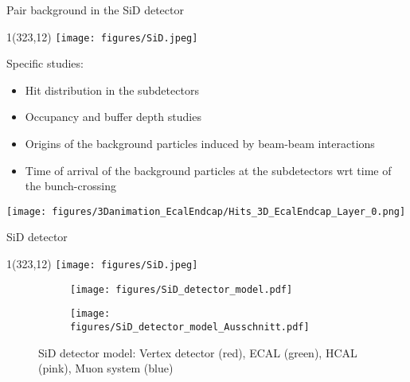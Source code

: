 \documentclass[xcolor={dvipsnames}]{beamer}
\newcommand{\sidlogo}{
  \setlength{\TPHorizModule}{1pt}
  \setlength{\TPVertModule}{1pt}
  \begin{textblock}{1}(323,12)
   \texttt{[image: figures/SiD.jpeg]}
  \end{textblock}
  }
\begin{document}
\begin{frame}{Pair background in the SiD detector}
\sidlogo
Specific studies:
\begin{itemize}
 \item Hit distribution in the subdetectors
 \item Occupancy and buffer depth studies
 \item Origins of the background particles induced by beam-beam interactions
 \item Time of arrival of the background particles at the subdetectors wrt time of the bunch-crossing
\end{itemize}
\begin{center}
 \texttt{[image: figures/3Danimation\_EcalEndcap/Hits\_3D\_EcalEndcap\_Layer\_0.png]}
\end{center}
\end{frame}

\begin{frame}{SiD detector}
\sidlogo
\begin{figure}[T]
\centering
\begin{subfigure}[b]{0.49\textwidth}
\centering
\texttt{[image: figures/SiD\_detector\_model.pdf]}
\end{subfigure}
\begin{subfigure}[b]{0.49\textwidth}
\centering
\texttt{[image: figures/SiD\_detector\_model\_Ausschnitt.pdf]}
\end{subfigure}
\caption{\small SiD detector model: Vertex detector (red), ECAL (green), HCAL (pink), Muon system (blue)}
\end{figure}
\end{frame}
\end{document}
